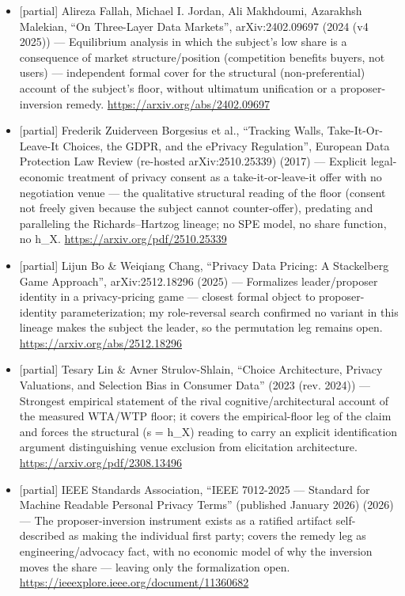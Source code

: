 \documentclass[
  11pt,
]{article}
\begin{document}
\begin{itemize}
  function of proposer identity. \url{https://arxiv.org/abs/2406.12457}
\item
  {[}partial{]} Alireza Fallah, Michael I. Jordan, Ali Makhdoumi,
  Azarakhsh Malekian, ``On Three-Layer Data Markets'', arXiv:2402.09697
  (2024 (v4 2025)) --- Equilibrium analysis in which the subject's low
  share is a consequence of market structure/position (competition
  benefits buyers, not users) --- independent formal cover for the
  structural (non-preferential) account of the subject's floor, without
  ultimatum unification or a proposer-inversion remedy.
  \url{https://arxiv.org/abs/2402.09697}
\item
  {[}partial{]} Frederik Zuiderveen Borgesius et al., ``Tracking Walls,
  Take-It-Or-Leave-It Choices, the GDPR, and the ePrivacy Regulation'',
  European Data Protection Law Review (re-hosted arXiv:2510.25339)
  (2017) --- Explicit legal-economic treatment of privacy consent as a
  take-it-or-leave-it offer with no negotiation venue --- the
  qualitative structural reading of the floor (consent not freely given
  because the subject cannot counter-offer), predating and paralleling
  the Richards--Hartzog lineage; no SPE model, no share function, no
  h\_X. \url{https://arxiv.org/pdf/2510.25339}
\item
  {[}partial{]} Lijun Bo \& Weiqiang Chang, ``Privacy Data Pricing: A
  Stackelberg Game Approach'', arXiv:2512.18296 (2025) --- Formalizes
  leader/proposer identity in a privacy-pricing game --- closest formal
  object to proposer-identity parameterization; my role-reversal search
  confirmed no variant in this lineage makes the subject the leader, so
  the permutation leg remains open.
  \url{https://arxiv.org/abs/2512.18296}
\item
  {[}partial{]} Tesary Lin \& Avner Strulov-Shlain, ``Choice
  Architecture, Privacy Valuations, and Selection Bias in Consumer
  Data'' (2023 (rev. 2024)) --- Strongest empirical statement of the
  rival cognitive/architectural account of the measured WTA/WTP floor;
  it covers the empirical-floor leg of the claim and forces the
  structural (s = h\_X) reading to carry an explicit identification
  argument distinguishing venue exclusion from elicitation architecture.
  \url{https://arxiv.org/pdf/2308.13496}
\item
  {[}partial{]} IEEE Standards Association, ``IEEE 7012-2025 ---
  Standard for Machine Readable Personal Privacy Terms'' (published
  January 2026) (2026) --- The proposer-inversion instrument exists as a
  ratified artifact self-described as making the individual first party;
  covers the remedy leg as engineering/advocacy fact, with no economic
  model of why the inversion moves the share --- leaving only the
  formalization open.
  \url{https://ieeexplore.ieee.org/document/11360682}
\end{itemize}
\end{document}
